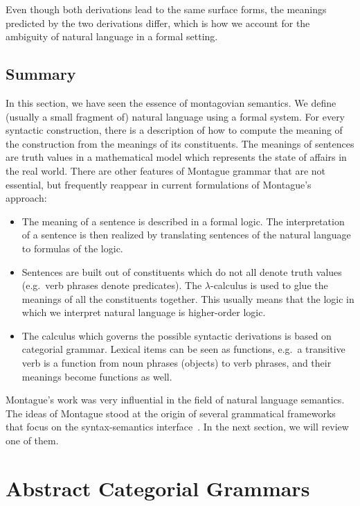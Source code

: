 Even though both derivations lead to the same surface forms, the meanings
predicted by the two derivations differ, which is how we account for the
ambiguity of natural language in a formal setting.

\subsection{Summary}
\label{ssec:montague-summary}

In this section, we have seen the essence of montagovian semantics. We
define (usually a small fragment of) natural language using a formal
system. For every syntactic construction, there is a description of how to
compute the meaning of the construction from the meanings of its
constituents. The meanings of sentences are truth values in a mathematical
model which represents the state of affairs in the real world. There are
other features of Montague grammar that are not essential, but frequently
reappear in current formulations of Montague's approach:

\begin{itemize}
\item The meaning of a sentence is described in a formal logic. The
  interpretation of a sentence is then realized by translating sentences of
  the natural language to formulas of the logic.
\item Sentences are built out of constituents which do not all denote truth
  values (e.g.\ verb phrases denote predicates). The $\lambda$-calculus is
  used to glue the meanings of all the constituents together. This usually
  means that the logic in which we interpret natural language is
  higher-order logic.
\item The calculus which governs the possible syntactic derivations is
  based on categorial grammar. Lexical items can be seen as functions,
  e.g.\ a transitive verb is a function from noun phrases (objects) to verb
  phrases, and their meanings become functions as well.
\end{itemize}

Montague's work was very influential in the field of natural language
semantics. The ideas of Montague stood at the origin of several grammatical
frameworks that focus on the syntax-semantics
interface~\cite{de2001towards,muskens2001lambda,pollard2008convergent,martin2014dynamic}.
In the next section, we will review one of them.


\section{Abstract Categorial Grammars}
\label{sec:acg}

